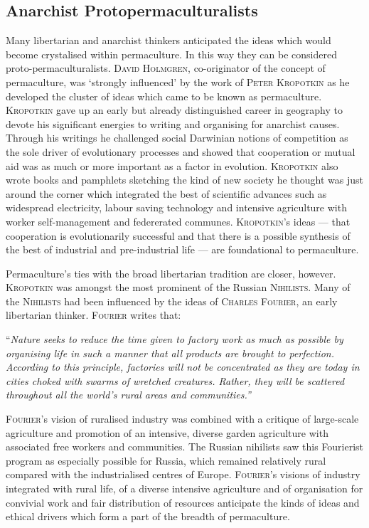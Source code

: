 \documentclass[a4paper, 11pt]{article}
\begin{document}
\begin{multicols*}{2}
\section*{Anarchist Protopermaculturalists}
 Many libertarian and anarchist thinkers anticipated the ideas which would become crystalised within permaculture.  In this way they can be considered proto-permaculturalists. \textsc{David Holmgren}, co-originator of the concept of permaculture, was `strongly influenced' by the work of \textsc{Peter Kropotkin} as he developed the cluster of ideas which came to be known as permaculture.  \textsc{Kropotkin} gave up an early but already distinguished career in geography to devote his significant energies to writing and organising for anarchist causes. Through his writings he challenged social Darwinian notions of competition as the sole driver of evolutionary processes and showed that cooperation or mutual aid was as much or more important as a factor in evolution.  \textsc{Kropotkin} also wrote books and pamphlets sketching the kind of new society he thought was just around the corner which integrated the best of scientific advances such as widespread electricity, labour saving technology and intensive agriculture with worker self-management and federerated communes.  \textsc{Kropotkin}'s ideas --- that cooperation is evolutionarily successful and that there is a possible synthesis of the best of industrial and pre-industrial life --- are foundational to permaculture.

  Permaculture's ties with the broad libertarian tradition are closer, however.  \textsc{Kropotkin} was amongst the most prominent of the Russian \textsc{Nihilists}. Many of the \textsc{Nihilists} had been influenced by the ideas of \textsc{Charles Fourier}, an early libertarian thinker. \textsc{Fourier} writes that: 

\vspace{1mm}
``\em{Nature seeks to reduce the time given to factory work as much as possible by organising life in such a manner that all products are brought to perfection.  According to this principle, factories will not be concentrated as they are today in cities choked with swarms of wretched creatures.  Rather, they will be scattered throughout all the world's rural areas and communities.}\em''
\vspace{1mm}

\textsc{Fourier}'s vision of ruralised industry was combined with a critique of large-scale agriculture and promotion of an intensive, diverse garden agriculture with associated free workers and communities.  The Russian nihilists saw this Fourierist program as especially possible for Russia, which remained relatively rural compared with the industrialised centres of Europe.  \textsc{Fourier}'s visions of industry integrated with rural life, of a diverse intensive agriculture and of organisation for convivial work and fair distribution of resources anticipate the kinds of ideas and ethical drivers which form a part of the breadth of permaculture.


\end{multicols*}
\end{document}
